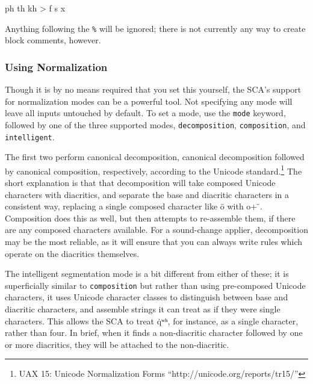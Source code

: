 \documentclass[10pt,letterpaper]{article}
\newcommand\textIPA[1]{{\fontIPA #1}}
\newcounter{excounter}
\newenvironment{vex}[1]{
	\vspace{1em}
	\refstepcounter{excounter}
	\noindent\makebox[3em][l]{(\arabic{excounter}\label{#1})}
	\minipage{\textwidth}
	\verbatim
}{
	\endverbatim
	\endminipage
	\vspace{1em}
}
\begin{document}
\begin{vex}{ex:comment}
ph th kh > f s x %
\end{vex}

\noindent
Anything following the \texttt{\%} will be ignored; there is not currently any way to create block comments, however. 


\subsubsection{Using Normalization} 
\label{ssub:using_normalization}
Though it is by no means required that you set this yourself, the SCA's support for normalization modes can be a powerful tool. Not specifying any mode will leave all inputs untouched by default. To set a mode, use the \texttt{mode} keyword, followed by one of the three supported modes, \texttt{decomposition}, \texttt{composition}, and \texttt{intelligent}.

The first two perform canonical decomposition, canonical decomposition followed by canonical composition, respectively, according to the Unicode standard.\footnote{UAX 15: Unicode Normalization Forms ``http://unicode.org/reports/tr15/''} The short explanation is that that decomposition will take composed Unicode characters with diacritics, and separate the base and diacritic characters in a consistent way, replacing a single composed character like ö with o+ ̈. Composition does this as well, but then attempts to re-assemble them, if there are any composed characters available. For a sound-change applier, decomposition may be the most reliable, as it will ensure that you can always write rules which operate on the diacritics themselves.


The intelligent segmentation mode is a bit different from either of these; it is superficially similar to \texttt{composition} but rather than using pre-composed Unicode characters, it uses Unicode character classes to distinguish between base and diacritic characters, and assemble strings it can treat as if they were single characters. This allows the SCA to treat \textIPA{q̇ʷʰ}, for instance, as a single character, rather than four. In brief, when it finds a non-diacritic character followed by one or more diacritics, they will be attached to the non-diacritic.
\end{document}

